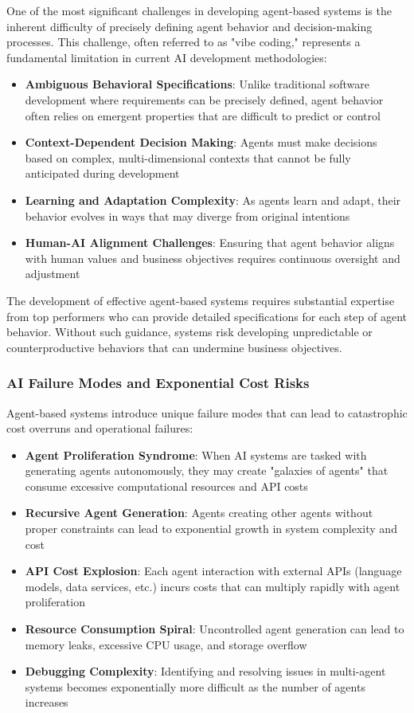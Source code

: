 One of the most significant challenges in developing agent-based systems is the inherent difficulty of precisely defining agent behavior and decision-making processes. This challenge, often referred to as "vibe coding," represents a fundamental limitation in current AI development methodologies:

\begin{itemize}
    \item \textbf{Ambiguous Behavioral Specifications}: Unlike traditional software development where requirements can be precisely defined, agent behavior often relies on emergent properties that are difficult to predict or control
    \item \textbf{Context-Dependent Decision Making}: Agents must make decisions based on complex, multi-dimensional contexts that cannot be fully anticipated during development
    \item \textbf{Learning and Adaptation Complexity}: As agents learn and adapt, their behavior evolves in ways that may diverge from original intentions
    \item \textbf{Human-AI Alignment Challenges}: Ensuring that agent behavior aligns with human values and business objectives requires continuous oversight and adjustment
\end{itemize}

The development of effective agent-based systems requires substantial expertise from top performers who can provide detailed specifications for each step of agent behavior. Without such guidance, systems risk developing unpredictable or counterproductive behaviors that can undermine business objectives.

\subsubsection{AI Failure Modes and Exponential Cost Risks}

Agent-based systems introduce unique failure modes that can lead to catastrophic cost overruns and operational failures:

\begin{itemize}
    \item \textbf{Agent Proliferation Syndrome}: When AI systems are tasked with generating agents autonomously, they may create "galaxies of agents" that consume excessive computational resources and API costs
    \item \textbf{Recursive Agent Generation}: Agents creating other agents without proper constraints can lead to exponential growth in system complexity and cost
    \item \textbf{API Cost Explosion}: Each agent interaction with external APIs (language models, data services, etc.) incurs costs that can multiply rapidly with agent proliferation
    \item \textbf{Resource Consumption Spiral}: Uncontrolled agent generation can lead to memory leaks, excessive CPU usage, and storage overflow
    \item \textbf{Debugging Complexity}: Identifying and resolving issues in multi-agent systems becomes exponentially more difficult as the number of agents increases
\end{itemize}

